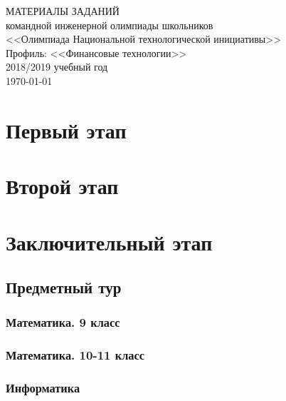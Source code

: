 \documentclass[a4paper,12pt,oneside]{book}
\begin{document}
\begin{titlepage}
    \begin{center}
        \huge{МАТЕРИАЛЫ ЗАДАНИЙ} \\
        \Large{командной инженерной олимпиады школьников} \\
        \Large{<<Олимпиада Национальной технологической инициативы>>} \\
        \Large{Профиль: <<Финансовые технологии>>} \\
        \large{2018/2019 учебный год} \\
        \vspace{2cm}
        \Large{\today}  
    \end{center}
\end{titlepage}

\setcounter{tocdepth}{1}

\tableofcontents

\part{Первый этап}




\part{Второй этап}



\part{Заключительный этап}

\clearpage
\chapter{Предметный тур}

\section{Математика. 9 класс}


\section{Математика. 10-11 класс}


\section{Информатика}

\end{document}
